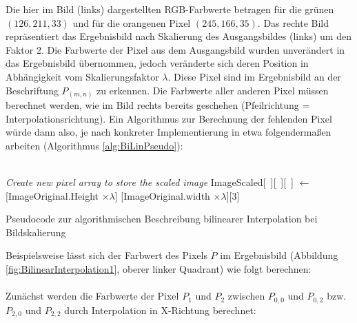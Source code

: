 \documentclass[
fontsize=10pt, 
listof = totoc,
parskip = half	
]{report}
\begin{document}
\noindent Die hier im Bild (links) dargestellten RGB-Farbwerte betragen für die grünen $(126, 211, 33)$ und für die orangenen Pixel $(245, 166, 35)$. Das rechte Bild repräsentiert das Ergebnisbild nach Skalierung des Ausgangsbildes (links) um den Faktor 2. Die Farbwerte der Pixel aus dem Ausgangsbild wurden unverändert in das Ergebnisbild übernommen, jedoch veränderte sich deren Position in Abhängigkeit vom Skalierungsfaktor $\lambda$. Diese Pixel sind im Ergebnisbild an der Beschriftung $P_{(m,n)}$ zu erkennen. Die Farbwerte aller anderen Pixel müssen berechnet werden, wie im Bild rechts bereits geschehen (Pfeilrichtung = Interpolationsrichtung). Ein Algorithmus zur Berechnung der fehlenden Pixel würde dann also, je nach konkreter Implementierung in etwa folgendermaßen arbeiten (Algorithmus \ref{alg:BiLinPseudo}):
\\\\
\begin{algorithm}[H]
	\BlankLine
	\BlankLine
	\emph{Create new pixel array to store the scaled image}\;
	ImageScaled[~][~][~] $\gets$ [ImageOriginal.Height $\times\lambda$] [ImageOriginal.width $\times\lambda$][3]\\
	\BlankLine
	\BlankLine
	\caption{Pseudocode zur algorithmischen Beschreibung bilinearer Interpolation bei Bildskalierung}
	\label{alg:BiLinPseudo}
\end{algorithm}
\bigskip
\noindent Beispielsweise lässt sich der Farbwert des Pixels $\dot{P}$  im Ergebnisbild (Abbildung \ref{fig:BilinearInterpolation1}, oberer linker Quadrant) wie folgt berechnen:
\\\\
\noindent Zunächst werden die Farbwerte der Pixel $P_1$ und $P_2$ zwischen $P_{0,0}$ und $P_{0,2}$ bzw. $P_{2,0}$ und $P_{2,2}$ durch Interpolation in X-Richtung berechnet:
\end{document}
